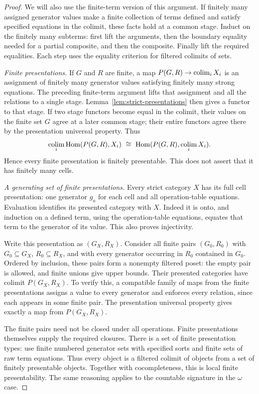 \begin{proof}
We will also use the finite-term version of this argument.
If finitely many assigned generator values make a finite
collection of terms defined and satisfy specified equations in
the colimit, these facts hold at a common stage. Induct on the
finitely many subterms: first lift the arguments, then the
boundary equality needed for a partial composite, and then
the composite. Finally lift the required equalities. Each step
uses the equality criterion for filtered colimits of sets.

\emph{Finite presentations.}
If $G$ and $R$ are finite, a map
$P(G,R)\to\operatorname*{colim}_iX_i$ is an assignment of finitely many generator
values satisfying finitely many strong equations. The preceding
finite-term argument lifts that assignment and all the relations
to a single stage. Lemma~\ref{lem:strict-presentations} then
gives a functor to that stage. If two stage functors become
equal in the colimit, their values on the finite set $G$ agree
at a later common stage; their entire functors agree there by
the presentation universal property. Thus
\[
 \operatorname*{colim}_i\operatorname{Hom}(P(G,R),X_i)
       \ \cong\ \operatorname{Hom}(P(G,R),\operatorname*{colim}_iX_i).
\]
Hence every finite presentation is finitely presentable.
This does not assert that it has finitely many cells.

\emph{A generating set of finite presentations.}
Every strict category $X$ has its full cell presentation:
one generator $g_a$ for each cell and all operation-table
equations. Evaluation identifies its presented category with
$X$. Indeed it is onto, and induction on a defined term,
using the operation-table equations, equates that term to
the generator of its value. This also proves injectivity.

Write this presentation as $(G_X,R_X)$. Consider all finite
pairs $(G_0,R_0)$ with $G_0\subseteq G_X$, $R_0\subseteq R_X$,
and with every generator occurring in $R_0$ contained in
$G_0$. Ordered by inclusion, these pairs form a nonempty
filtered poset: the empty pair is allowed, and finite unions
give upper bounds. Their presented categories have colimit
$P(G_X,R_X)$. To verify this, a compatible family of maps
from the finite presentations assigns a value to every
generator and enforces every relation, since each appears
in some finite pair. The presentation universal property
gives exactly a map from $P(G_X,R_X)$.

The finite pairs need not be closed under all operations.
Finite presentations themselves supply the required closures.
There is a set of finite presentation types: use finite
numbered generator sets with specified sorts and finite sets
of raw term equations. Thus every object is a filtered
colimit of objects from a set of finitely presentable objects.
Together with cocompleteness, this is local finite
presentability. The same reasoning applies to the countable
signature in the $\omega$ case.


\end{proof}
